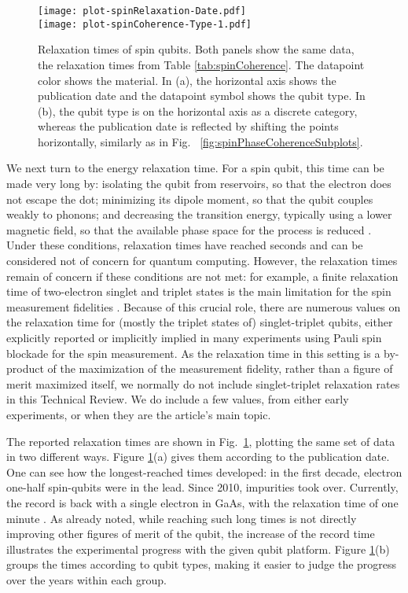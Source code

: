 \documentclass[aps, prx, showpacs, twocolumn, superscriptaddress, notitlepage, longbibliography, floatfix, nofootinbib]{revtex4-2}
\newcommand{\recheck}[1]{{#1}}
\begin{document}
\begin{figure}
  \texttt{[image: plot-spinRelaxation-Date.pdf]} \hfill\\
  \texttt{[image: plot-spinCoherence-Type-1.pdf]} \hfill
  \caption{
  \label{fig:spinRelaxation}
  Relaxation times of spin qubits. Both panels show the same data, the relaxation times from Table \ref{tab:spinCoherence}. The datapoint color shows the material. In (a), the horizontal axis shows the publication date and the datapoint symbol shows the qubit type. In (b), the qubit type is on the horizontal axis as a discrete category, whereas the publication date is reflected by shifting the points horizontally, similarly as in Fig. ~\ref{fig:spinPhaseCoherenceSubplots}.}
\end{figure}


We next turn to the energy relaxation time. For a spin qubit, this time can be made very long by: isolating the qubit from reservoirs, so that the electron does not escape the dot; minimizing its dipole moment, so that the qubit couples weakly to phonons; and decreasing the transition energy, typically using a lower magnetic field, so that the available phase space for the process is reduced \cite{shrivastava_theory_1983,khaetskii_spin-flip_2001}. Under these conditions, relaxation times have reached seconds and can be considered not of concern for quantum computing. However, the relaxation times remain of concern if these conditions are not met: for example, a finite relaxation time of two-electron singlet and triplet states is the main limitation for the spin measurement fidelities \cite{barthel_rapid_2009,nakajima_robust_2017,broome_high-fidelity_2017}. 
Because of this crucial role, there are numerous values on the relaxation time for (mostly the triplet states of) singlet-triplet qubits, either explicitly reported or implicitly implied in many experiments using Pauli spin blockade for the spin measurement. As the relaxation time in this setting is a by-product of the maximization of the measurement fidelity, rather than a figure of merit maximized itself, we normally do not include singlet-triplet relaxation rates in this Technical Review. We do include a few values, from either early experiments, or when they are the article's main topic.

The reported relaxation times are shown in Fig.~\ref{fig:spinRelaxation}, plotting the same set of data in two different ways. Figure \ref{fig:spinRelaxation}(a) gives them according to the publication date. One can see how the longest-reached times developed: in the first decade, electron one-half spin-qubits were in the lead. Since 2010, impurities took over. \recheck{Currently, the record is back with a single electron in GaAs, with the relaxation time of one minute \cite{camenzind_hyperfine-phonon_2018}.} As already noted, while reaching such long times is not directly improving other figures of merit of the qubit, the increase of the record time illustrates the experimental progress with the given qubit platform. Figure \ref{fig:spinRelaxation}(b) groups the times according to qubit types, making it easier to judge the progress over the years within each group. 
\end{document}
